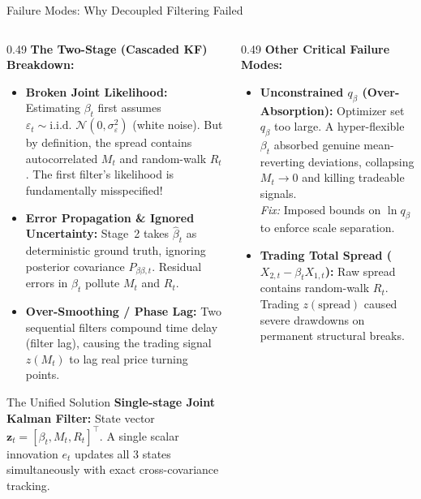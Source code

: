 \documentclass[10pt, aspectratio=169]{beamer}
\begin{document}
\begin{frame}{Failure Modes: Why Decoupled Filtering Failed}
  \small
  \begin{columns}[T]
    \begin{column}{0.49\textwidth}
      \textbf{The Two-Stage (Cascaded KF) Breakdown:}
      \begin{itemize}
        \item \textbf{Broken Joint Likelihood:} Estimating $\beta_t$ first assumes $\varepsilon_t \sim \text{i.i.d. } \mathcal{N}(0, \sigma_\varepsilon^2)$ (white noise). But by definition, the spread contains autocorrelated $M_t$ and random-walk $R_t$. The first filter's likelihood is fundamentally misspecified!
        \item \textbf{Error Propagation \& Ignored Uncertainty:} Stage~2 takes $\hat{\beta}_t$ as deterministic ground truth, ignoring posterior covariance $P_{\beta\beta, t}$. Residual errors in $\beta_t$ pollute $M_t$ and $R_t$.
        \item \textbf{Over-Smoothing / Phase Lag:} Two sequential filters compound time delay (filter lag), causing the trading signal $z(M_t)$ to lag real price turning points.
      \end{itemize}
      \vspace{2pt}
      \begin{block}{The Unified Solution}
        \textbf{Single-stage Joint Kalman Filter:} State vector $\bm{z}_t = [\beta_t, M_t, R_t]^\top$. A single scalar innovation $e_t$ updates all 3 states simultaneously with exact cross-covariance tracking.
      \end{block}
    \end{column}
    \begin{column}{0.49\textwidth}
      \textbf{Other Critical Failure Modes:}
      \vspace{2pt}
      \begin{itemize}
        \item \textbf{Unconstrained $q_\beta$ (Over-Absorption):}
              Optimizer set $q_\beta$ too large. A hyper-flexible $\beta_t$ absorbed genuine mean-reverting deviations, collapsing $M_t \to 0$ and killing tradeable signals.
              \\\emph{Fix:} Imposed bounds on $\ln q_\beta$ to enforce scale separation.
        \item \textbf{Trading Total Spread ($X_{2,t} - \beta_t X_{1,t}$):}
              Raw spread contains random-walk $R_t$. Trading $z(\text{spread})$ caused severe drawdowns on permanent structural breaks.

\end{itemize}
\end{column}
\end{columns}
\end{frame}
\end{document}
